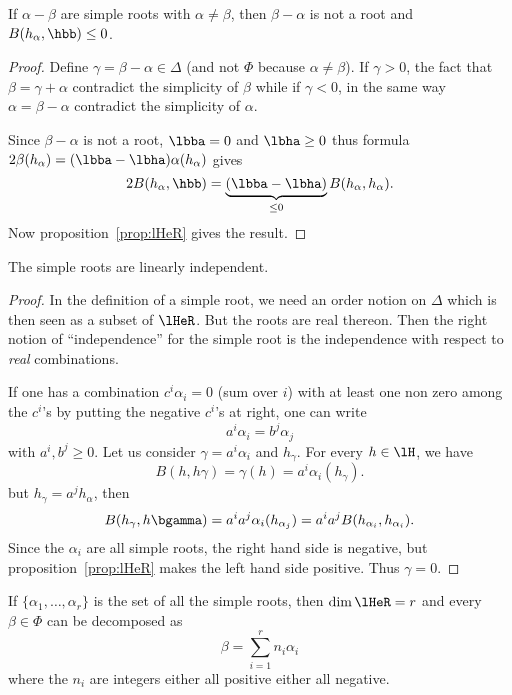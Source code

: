 \begin{lemma}
	If $\alpha-\beta$ are simple roots with $\alpha\neq\beta$, then $\beta-\alpha$ is not a root and $B( h_{\alpha},\hbb)\leq 0$.
\end{lemma}

\begin{proof}
	Define $\gamma=\beta-\alpha\in\Delta$ (and not $\Phi$ because $\alpha\neq\beta$). If $\gamma>0$, the fact that $\beta=\gamma+\alpha$ contradict the simplicity of $\beta$ while if $\gamma<0$, in the same way $\alpha=\beta-\alpha$ contradict the simplicity of $\alpha$.

	Since $\beta-\alpha$ is not a root, $\lbba=0$ and $\lbha\geq 0$ thus formula $2\beta( h_{\alpha})=(\lbba-\lbha)\alpha( h_{\alpha})$ gives
	\begin{equation}
		2B( h_{\alpha},\hbb)=\underbrace{(\lbba-\lbha)}_{\leq 0}B( h_{\alpha}, h_{\alpha}).
	\end{equation}
	Now proposition~\ref{prop:lHeR} gives the result.
\end{proof}

\begin{lemma}
	The simple roots are linearly independent.
\end{lemma}

\begin{proof}
	In the definition of a simple root, we need an order notion on $\Delta$ which is then seen as a subset of $\lHeR$. But the roots are real thereon. Then the right notion of ``independence''{} for the simple root is the independence with respect to \emph{real} combinations.

	If one has a combination $c^i\alpha_i=0$ (sum over $i$) with at least one non zero among the $c^i$'s  by putting the negative $c^i$'s at right, one can write
	\[
		a^i\alpha_i=b^j\alpha_j
	\]
	with $a^i,b^j\geq 0$. Let us consider $\gamma=a^i\alpha_i$ and $h_{\gamma}$. For every $h\in\lH$, we have
	\[
		B(h,h\gamma)=\gamma(h)=a^i\alpha_i(h_{\gamma}).
	\]
	but $h_{\gamma}=a^jh_{\alpha}$, then
	\begin{equation}
		B(h_{\gamma},h\bgamma)=a^ia^j\alpha_i(h_{\alpha_j})
		=a^ia^jB(h_{\alpha_i},h_{\alpha_i}).
	\end{equation}
	Since the $\alpha_i$ are all simple roots, the right hand side is negative, but proposition~\ref{prop:lHeR} makes the left hand side positive. Thus $\gamma=0$.
\end{proof}

\begin{theorem}
	If $\{\alpha_1,\ldots,\alpha_r\}$ is the set of all the simple roots, then $\dim\lHeR=r$ and every $\beta\in\Phi$ can be decomposed as
	\[
		\beta=\sum_{i=1}^rn_i\alpha_i
	\]
	where the $n_i$ are integers either all positive either all negative.
\end{theorem}

